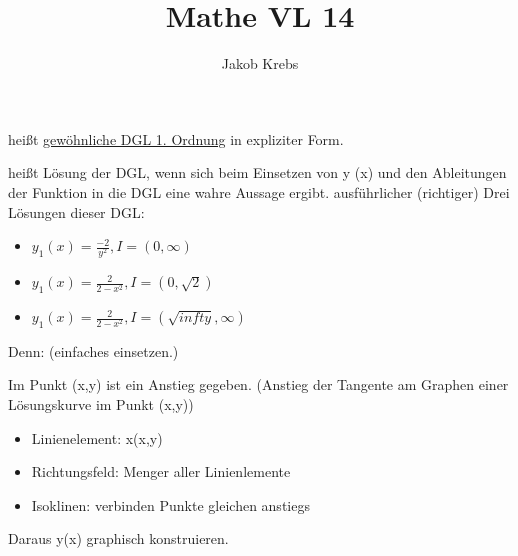 \documentclass{../tudscript}
\author{Jakob Krebs}
\title{Mathe VL 14}
\begin{document}
            heißt \underline{gewöhnliche DGL 1. Ordnung} in expliziter Form.
            
            heißt Lösung der DGL, wenn sich beim Einsetzen von y (x) und den Ableitungen
            der Funktion in die DGL eine wahre Aussage ergibt.
            ausführlicher (richtiger)
            Drei Lösungen dieser DGL:
            \begin{itemize}
                \item $y_1 (x) = \frac{-2}{y^2}, I = (0, \infty)$
                \item $y_1 (x) = \frac{2}{2-x^2}, I = (0, \sqrt{2})$
                \item $y_1 (x) = \frac{2}{2-x^2}, I = (\sqrt{infty}, \infty)$
            \end{itemize}
            Denn: (einfaches einsetzen.)

            Im Punkt (x,y) ist ein Anstieg gegeben. (Anstieg der Tangente am
            Graphen einer Lösungskurve im Punkt (x,y))

            \begin{itemize}
                \item Linienelement: x(x,y)
                \item Richtungsfeld: Menger aller Linienlemente
                \item Isoklinen: verbinden Punkte gleichen anstiegs
            \end{itemize}
            Daraus y(x) graphisch konstruieren.
\end{document}
